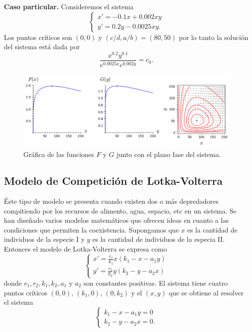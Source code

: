 \documentclass[11pt,letterpaper,draft]{report}
\newcommand\<{\langle}
\renewcommand\>{\rangle}
\begin{document}
\noindent \textbf{Caso particular.} Consideremos el sistema
\[
  \begin{cases}
    x' = -0.1x + 0.002xy\\
    y' = 0.2y - 0.0025xy.
  \end{cases}
\] Los puntos críticos son $(0,0)$ y $(c / d, a / b) = (80, 50)$ por lo tanto la solución del sistema está dada por
\[
\frac{x^{0.2}y^{0.1}}{e^{0.0025x}e^{0.002y}} = c_0.
\] 
\begin{figure}[h]
  \centering
  \includegraphics[width=1.\linewidth]{img/lotka-volterra-1.png}
  \caption{Gráfica de las funciones $F$ y $G$ junto con el plano fase del sistema.}%
  \label{fig:lotka-volterra-1}
\end{figure}

\subsection{Modelo de Competición de Lotka-Volterra}

Éste tipo de modelo se presenta cuando existen dos o más depredadores compitiendo por los recursos de alimento, agua, espacio, etc en un sistema. Se han diseñado varios modelos matemáticos que ofrecen ideas en cuanto a las condiciones que permiten la coexistencia. Supongamos que $x$ es la cantidad de individuos de la especie I y $y$ es la cantidad de individuos de la especia II. Entonces el modelo de Lotka-Volterra se expresa como
\[
\begin{cases}
  x' = \frac{r_1}{k_1}x(k_1 - x - a_1 y)\\
  y' = \frac{r_2}{k_2}y(k_2 - y - a_2 x)
\end{cases}
\] donde $r_1, r_2, k_1, k_2, a_1$ y $a_2$ son constantes positivas. El sistema tiene cuatro puntos críticos $(0,0)$, $(k_1,0)$, $(0,k_2)$ y el $(x,y)$ que se obtiene al resolver el sistema
\[
\begin{cases}
  k_1 - x - a_1 y = 0\\
  k_2 - y - a_2 x = 0.
\end{cases}
\] 
\end{document}
